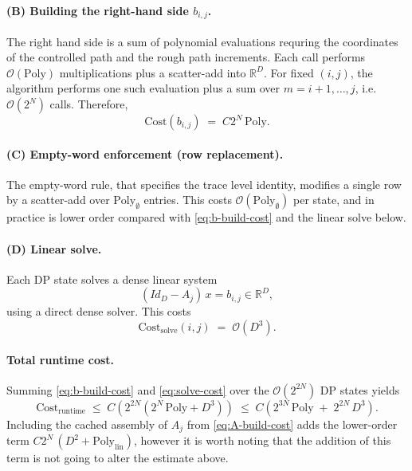 \documentclass{article}%
\begin{document}
\paragraph{(B) Building the right-hand side $b_{i,j}$.}
The right hand side is a sum of polynomial evaluations requring the coordinates of the controlled path and the rough path increments.
Each call performs $\mathcal{O}(\mathrm{Poly})$ multiplications plus a scatter-add into $\mathbb{R}^D$.
For fixed $(i,j)$, the algorithm performs one such evaluation plus a sum over $m=i+1,\dots,j$, i.e.\ $\mathcal{O}(2^N)$ calls.
Therefore,
\begin{equation}
  \label{eq:b-build-cost}
  \mathrm{Cost}(b_{i,j})
  \;=\;
  C 2^N \,\mathrm{Poly}.
\end{equation}

\paragraph{(C) Empty-word enforcement (row replacement).}
The empty-word rule, that specifies the trace level identity,  modifies a single row by a scatter-add over $\mathrm{Poly}_{\emptyset}$ entries.
This costs $\mathcal{O}(\mathrm{Poly}_{\emptyset})$ per state, and in practice is lower order compared with
\eqref{eq:b-build-cost} and the linear solve below.

\paragraph{(D) Linear solve.}
Each DP state solves a dense linear system
\[
(Id_D - A_j)\, x = b_{i,j} \in \mathbb{R}^D,
\]
using a direct dense solver. This costs
\begin{equation}
  \label{eq:solve-cost}
  \mathrm{Cost}_{\mathrm{solve}}(i,j)
  \;=\;
  \mathcal{O}(D^3).
\end{equation}

\paragraph{Total runtime cost.}
Summing \eqref{eq:b-build-cost} and \eqref{eq:solve-cost} over the $\mathcal{O}(2^{2N})$ DP states yields
\begin{equation}
  \label{eq:total-runtime}
  \mathrm{Cost}_{\mathrm{runtime}}
  \;\leq\;
  C\!\left(
    2^{2N} (2^N\,\mathrm{Poly} + D^3)
  \right)
  \;\leq\;
  C\left(
    2^{3N}\,\mathrm{Poly} \;+\; 2^{2N}\,D^3
  \right).
\end{equation}
Including the cached assembly of $A_j$ from \eqref{eq:A-build-cost} adds the lower-order term
$C2^N\,(D^2 + \mathrm{Poly}_{\mathrm{lin}})$, however it is worth noting that the addition of this term is not going to alter the estimate above.
\end{document}
